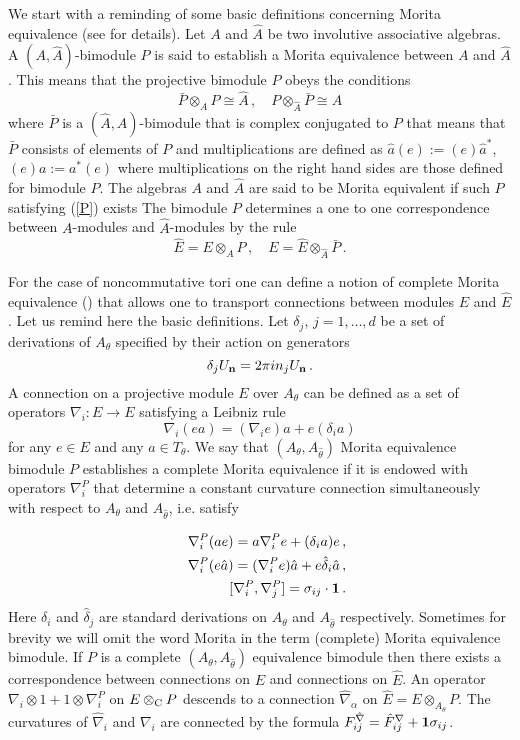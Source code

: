 \documentclass[a4paper,a4paper]{article}
\begin{document}
{We start with a  reminding of some basic definitions concerning Morita equivalence (see \cite{ASMorita} for details).
Let $A$ and $\hat A$ be two involutive associative algebras. 
A $(A,\hat A)$-bimodule $P$ is said to  establish a   Morita equivalence between $A$ and 
$\hat A$. This means that the projective bimodule $P$ obeys the conditions 
\begin{equation} \label{P}
\bar P\otimes_{A}P\cong \hat A \, , \quad P\otimes_{\hat A}\bar P \cong A 
\end{equation}
where $\bar P$ is a $(\hat A, A)$-bimodule  that is  complex conjugated to $P$ that means that 
$\bar P$ consists of elements of $P$ and multiplications are defined as $\hat a (e) := (e) \hat a^{*}$, 
$ (e)a := a^{*} (e)$ where multiplications on the right hand sides are those defined for bimodule $P$.   
The algebras $A$ and $\hat A$ are said to be Morita equivalent if such $P$ satisfying  (\ref{P}) exists
The bimodule $P$ determines a one to one correspondence between $A$-modules and 
$\hat A$-modules by the rule 
$$
\hat E=E\otimes_{A}P \, , \quad E=\hat E\otimes_{\hat A}\bar P \, .
$$ 

For the case of noncommutative tori one can define a notion of complete Morita equivalence (\cite{ASMorita})
that allows one to transport connections between modules $E$ and $\hat E$. 
Let us remind here the basic  definitions. Let $\delta_{j}$, $j=1,\dots , d$ be a set of derivations of  $A_{\theta}$ 
specified by their action on generators  
$$
\delta_{j}U_{\bf n} = 2\pi i n_{j}U_{\bf n} \, .
$$ 
A connection on a projective module $E$ over $A_{\theta}$ can be defined as a set of operators 
$\nabla_{i}: E\to E$ satisfying a Leibniz rule 
$$
\nabla_{i}(ea) = (\nabla_{i}e)a + e(\delta_{i}a)
$$
for any $e\in E$ and any $a\in T_{\theta}$. 
We say that $(A_{\theta},A_{\hat \theta})$ Morita equivalence bimodule $P$ establishes a complete Morita equivalence if it
is endowed with operators $\nabla^{P}_{i}$ that determine a constant curvature connection 
simultaneously with respect to $A_{\theta}$ and $A_{\hat \theta}$, i.e. satisfy  

\begin{eqnarray}\label{biconnect}
&&\nabla^{P}_{i}(ae)=a\nabla^{P}_{i}e + (\delta_{i}a)e \, , \nonumber \\
&&\nabla^{P}_{i}(e\hat a)=(\nabla^{P}_{i}e)\hat a + e\hat \delta_{i} \hat a \, , \nonumber \\
&&[\nabla^{P}_{i},\nabla^{P}_{j}]=\sigma_{ij}\cdot {\bf 1} \, .
\end{eqnarray} 
Here  $\delta_{i}$ and $\hat \delta_{j}$ are standard derivations on $A_{\theta}$ and $A_{\hat \theta}$ respectively. 
Sometimes for brevity we will omit the word Morita in the term (complete) Morita equivalence bimodule.
If $P$ is a complete  $(A_{\theta},A_{\hat \theta})$ equivalence  bimodule then there exists a correspondence 
between connections on $E$ and connections on $\hat E$. An operator 
$\nabla_{i}\otimes 1 + 1\otimes \nabla_{i}^{P}$ on $E\otimes_{\rm C}P$ descends to a 
connection $\hat \nabla_{\alpha}$ on $\hat E = E\otimes_{A_{\theta}}P$. The curvatures of 
$\hat \nabla_{i}$ and $\nabla_{i}$ are connected by the formula 
$F_{ij}^{\hat \nabla}=\hat F_{ij}^{\nabla} + {\bf 1}\sigma_{ij}$. 


}
\end{document}
